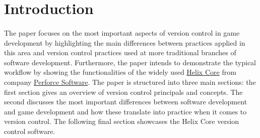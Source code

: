 \section{Introduction}
  \paragraph{}
  The paper focuses on the most important aspects of version control in game development by highlighting the main 
  differences between practices applied in this area and version control practices used at more traditional branches 
  of software development. Furthermore, the paper intends to demonstrate the typical workflow by showing the 
  functionalities of the widely used \href{https://www.perforce.com/products/helix-core}{Helix Core\textsuperscript{\texttrademark}} 
  from company \href{https://www.perforce.com/}{Perforce Software}.  
  The paper is structured into three main sections: the first section gives an overview of version control principals and
  concepts. The second discusses the most important differences between software development and game development and 
  how these translate into practice when it comes to version control.
  The following final section showcases the Helix Core\textsuperscript{\texttrademark} version control software.